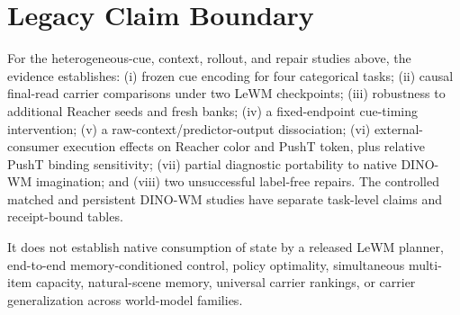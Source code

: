 \section{Legacy Claim Boundary}

For the heterogeneous-cue, context, rollout, and repair studies above, the
evidence establishes: (i) frozen cue encoding for four categorical tasks;
(ii) causal final-read carrier comparisons under two LeWM checkpoints;
(iii) robustness to additional Reacher seeds and fresh banks; (iv) a
fixed-endpoint cue-timing intervention; (v) a raw-context/predictor-output
dissociation; (vi) external-consumer execution effects on Reacher color and
PushT token, plus relative PushT binding sensitivity; (vii) partial diagnostic
portability to native DINO-WM imagination; and (viii) two unsuccessful
label-free repairs.  The controlled matched and persistent DINO-WM studies
have separate task-level claims and receipt-bound tables.

It does not establish native consumption of state by a released LeWM planner, end-to-end memory-conditioned control, policy optimality, simultaneous multi-item capacity, natural-scene memory, universal carrier rankings, or carrier generalization across world-model families.
